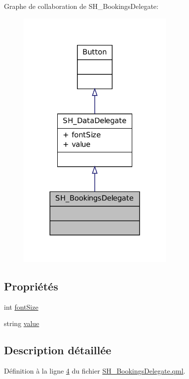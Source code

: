 Graphe de collaboration de S\-H\-\_\-\-Bookings\-Delegate\-:\nopagebreak
\begin{figure}[H]
\begin{center}
\leavevmode
\includegraphics[width=216pt]{classSH__BookingsDelegate__coll__graph}
\end{center}
\end{figure}
\subsection*{Propriétés}
\begin{DoxyCompactItemize}
\item 
int \hyperlink{classSH__DataDelegate_afbb41ad9b513c7f27e7b5ad90d82e95b}{font\-Size}
\item 
string \hyperlink{classSH__DataDelegate_acb9da3c73493c88865e08d9575f26482}{value}
\end{DoxyCompactItemize}


\subsection{Description détaillée}


Définition à la ligne \hyperlink{SH__BookingsDelegate_8qml_source_l00004}{4} du fichier \hyperlink{SH__BookingsDelegate_8qml_source}{S\-H\-\_\-\-Bookings\-Delegate.\-qml}.



